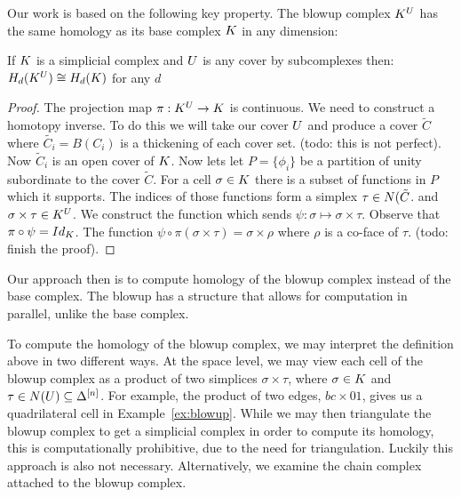 Our work is based on the following key property.
The blowup complex $K^U$ has the same homology as its base complex $K$ in any 
dimension: 
\begin{theorem}
If $K$ is a simplicial complex and $U$ is any cover by subcomplexes then:
$H_d(K^U) \cong H_d(K)$ for any $d$
\end{theorem}
\begin{proof}
The projection map $\pi : K^U \rightarrow K$ is continuous. We need to construct a homotopy inverse. To do this we will take our cover $U$ and produce a cover $\tilde{C}$ where $\tilde{C_i} = B(C_i)$ is a thickening of each cover set. (todo: this is not perfect).
Now $\tilde{C}_i$ is an open cover of $K$. Now lets let $P = \{\phi_i\}$ be a partition of unity subordinate to the cover $\tilde{C}$. For a cell $\sigma \in K$ there is a subset of functions in $P$ which it supports. The indices of those functions form a simplex $\tau \in N(\tilde{C}$. and $\sigma \times \tau \in K^U$. We construct the function which sends $\psi: \sigma \mapsto \sigma \times \tau$. Observe that $\pi \circ \psi = Id_K$. The function $\psi \circ \pi(\sigma \times \tau) = \sigma \times \rho$ where $\rho$ is a co-face of $\tau$. (todo: finish the proof).
\end{proof}
Our approach then is to compute homology of the blowup complex 
instead of the base complex. The blowup has a structure that allows 
for computation in parallel, unlike the base complex.

To compute the homology of the blowup complex, we may interpret the definition 
above in two different ways.  
At the space level, we may view each cell of the blowup complex as a product 
of two simplices $\sigma \times \tau$, where 
$\sigma \in K$ and $\tau \in N(U) \subseteq \Delta^{[n]}$.  
For example, the product of two edges, $bc \times 01$, gives us a 
quadrilateral cell in Example~\ref{ex:blowup}.  
While we may then triangulate the blowup complex to get a simplicial complex in order 
to compute its homology, this is computationally prohibitive, due to the need for triangulation. 
Luckily this approach is also not necessary. Alternatively, we 
examine the chain complex attached to the blowup complex.

